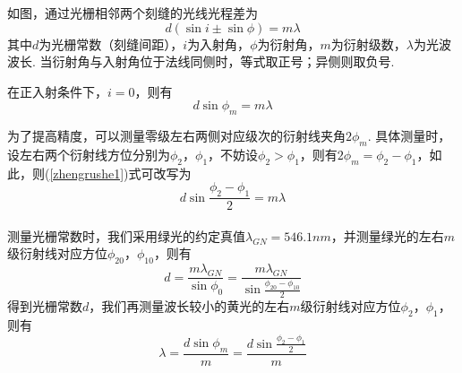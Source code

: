 \documentclass[UTF8]{ctexart}
\begin{document}
如图，通过光栅相邻两个刻缝的光线光程差为
\begin{equation}
    \label{yanshe}
    d(\sin i\pm\sin \phi)=m\lambda
\end{equation}
其中$d$为光栅常数（刻缝间距），$i$为入射角，$\phi$为衍射角，$m$为衍射级数，$\lambda$为光波波长. 当衍射角与入射角位于法线同侧时，等式取正号；异侧则取负号.\par
在正入射条件下，$i=0$，则有
\begin{equation}
    \label{zhengrushe1}
    d\sin\phi_m=m\lambda
\end{equation}\par
为了提高精度，可以测量零级左右两侧对应级次的衍射线夹角$2\phi_m$. 具体测量时，设左右两个衍射线方位分别为$\phi_2$，$\phi_1$，不妨设$\phi_2>\phi_1$，则有$2\phi_m=\phi_2-\phi_1$，如此，则(\ref{zhengrushe1})式可改写为
\begin{equation}
    \label{zhengrushe2}
    d\sin\frac{\phi_2-\phi_1}{2}=m\lambda
\end{equation}\\
测量光栅常数时，我们采用绿光的约定真值$\lambda_{GN}=546.1nm$，并测量绿光的左右$m$级衍射线对应方位$\phi_{20}$，$\phi_{10}$，则有
\begin{equation}
    \label{d}
    d=\frac{m\lambda_{GN}}{\sin\phi_0}=\frac{m\lambda_{GN}}{\sin\frac{\phi_{20}-\phi_{10}}{2}}
\end{equation}
得到光栅常数$d$，我们再测量波长较小的黄光的左右$m$级衍射线对应方位$\phi_2$，$\phi_1$，则有
\begin{equation}
    \label{lambda}
    \lambda=\frac{d\sin\phi_m}{m}=\frac{d\sin\frac{\phi_{2}-\phi_{1}}{2}}{m}
\end{equation}\\
\end{document}
